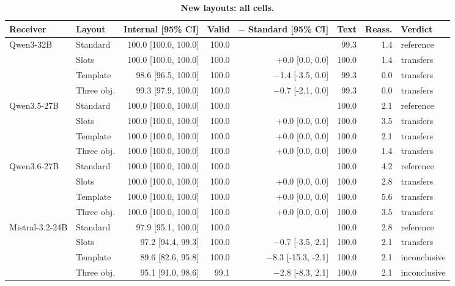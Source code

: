 \begin{table}[!htbp]
\caption{\textbf{New layouts: all cells.}}
\label{tab:layout_full}
\centering\scriptsize
\setlength{\tabcolsep}{2.5pt}
\begin{tabular*}{\linewidth}{@{\extracolsep{\fill}}llrrrrrl@{}}
\toprule
Receiver & Layout & Internal [95\% CI] & Valid & $-$ Standard [95\% CI] & Text & Reass. & Verdict \\
\midrule
Qwen3-32B & Standard & 100.0 [100.0, 100.0] & 100.0 &  & 99.3 & 1.4 & reference \\
 & Slots & 100.0 [100.0, 100.0] & 100.0 & +0.0 [0.0, 0.0] & 100.0 & 1.4 & transfers \\
 & Template & 98.6 [96.5, 100.0] & 100.0 & $-$1.4 [-3.5, 0.0] & 99.3 & 0.0 & transfers \\
 & Three obj. & 99.3 [97.9, 100.0] & 100.0 & $-$0.7 [-2.1, 0.0] & 99.3 & 0.0 & transfers \\
\addlinespace[2pt]
Qwen3.5-27B & Standard & 100.0 [100.0, 100.0] & 100.0 &  & 100.0 & 2.1 & reference \\
 & Slots & 100.0 [100.0, 100.0] & 100.0 & +0.0 [0.0, 0.0] & 100.0 & 3.5 & transfers \\
 & Template & 100.0 [100.0, 100.0] & 100.0 & +0.0 [0.0, 0.0] & 100.0 & 2.1 & transfers \\
 & Three obj. & 100.0 [100.0, 100.0] & 100.0 & +0.0 [0.0, 0.0] & 100.0 & 1.4 & transfers \\
\addlinespace[2pt]
Qwen3.6-27B & Standard & 100.0 [100.0, 100.0] & 100.0 &  & 100.0 & 4.2 & reference \\
 & Slots & 100.0 [100.0, 100.0] & 100.0 & +0.0 [0.0, 0.0] & 100.0 & 2.8 & transfers \\
 & Template & 100.0 [100.0, 100.0] & 100.0 & +0.0 [0.0, 0.0] & 100.0 & 5.6 & transfers \\
 & Three obj. & 100.0 [100.0, 100.0] & 100.0 & +0.0 [0.0, 0.0] & 100.0 & 3.5 & transfers \\
\addlinespace[2pt]
Mistral-3.2-24B & Standard & 97.9 [95.1, 100.0] & 100.0 &  & 100.0 & 2.8 & reference \\
 & Slots & 97.2 [94.4, 99.3] & 100.0 & $-$0.7 [-3.5, 2.1] & 100.0 & 2.1 & transfers \\
 & Template & 89.6 [82.6, 95.8] & 100.0 & $-$8.3 [-15.3, -2.1] & 100.0 & 2.1 & inconclusive \\
 & Three obj. & 95.1 [91.0, 98.6] & 99.1 & $-$2.8 [-8.3, 2.1] & 100.0 & 2.1 & inconclusive \\

\end{tabular*}
\end{table}
